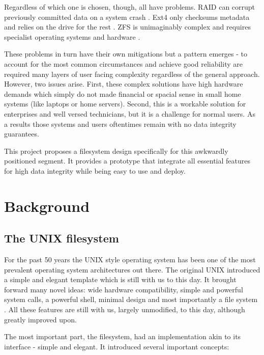     Regardless of which one is chosen, though, all have problems. RAID can
    corrupt previously committed data on a system crash \cite{LWN_md_journal}.
    Ext4 only checksums metadata and relies on the drive for the rest
    \cite{ext4_docs}. ZFS is unimaginably complex \cite{ZFS_spec} and requires
    specialist operating systems and hardware \cite{TrueNAS_hardware_guide}.

    These problems in turn have their own mitigations but a pattern emerges -
    to account for the most common circumstances and achieve good reliability
    are required many layers of user facing complexity regardless of the
    general approach. However, two issues arise. First, these complex solutions
    have high hardware demands which simply do not made financial or spacial
    sense in small home systems (like laptops or home servers). Second, this is
    a workable solution for enterprises and well versed technicians, but it is
    a challenge for normal users. As a results those systems and users
    oftentimes remain with no data integrity guarantees.

    This project proposes a filesystem design specifically for this awkwardly
    positioned segment. It provides a prototype that integrate all essential
    features for high data integrity while being easy to use and deploy.

\chapter{Background}
    \section{The UNIX filesystem}
        \label{sec:UFS}

        For the past 50 years the UNIX style operating system has been one of
        the most prevalent operating system architectures out there. The
        original UNIX introduced a simple and elegant template which is still
        with us to this day. It brought forward many novel ideas: wide hardware
        compatibility, simple and powerful system calls, a powerful shell,
        minimal design and most importantly a file system \cite{UFS}. All these
        features are still with us, largely unmodified, to this day, although
        greatly improved upon.

        The most important part, the filesystem, had an implementation akin to
        its interface - simple and elegant. It introduced several important
        concepts:

